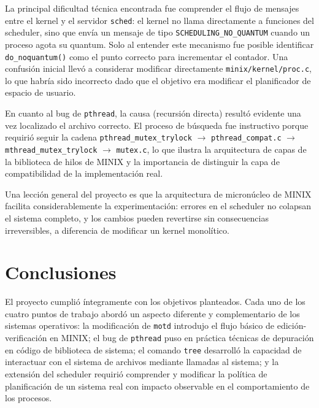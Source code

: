 \documentclass[11pt,a4paper]{article}
\begin{document}
La principal dificultad t\'ecnica encontrada fue comprender el flujo de mensajes entre el kernel y el servidor \texttt{sched}: el kernel no llama directamente a funciones del scheduler, sino que env\'ia un mensaje de tipo \texttt{SCHEDULING\_NO\_QUANTUM} cuando un proceso agota su quantum. Solo al entender este mecanismo fue posible identificar \texttt{do\_noquantum()} como el punto correcto para incrementar el contador. Una confusi\'on inicial llev\'o a considerar modificar directamente \texttt{minix/kernel/proc.c}, lo que habr\'ia sido incorrecto dado que el objetivo era modificar el planificador de espacio de usuario.

En cuanto al bug de \texttt{pthread}, la causa (recursi\'on directa) result\'o evidente una vez localizado el archivo correcto. El proceso de b\'usqueda fue instructivo porque requiri\'o seguir la cadena \texttt{pthread\_mutex\_trylock} $\to$ \texttt{pthread\_compat.c} $\to$ \texttt{mthread\_mutex\_trylock} $\to$ \texttt{mutex.c}, lo que ilustra la arquitectura de capas de la biblioteca de hilos de MINIX y la importancia de distinguir la capa de compatibilidad de la implementaci\'on real.

Una lecci\'on general del proyecto es que la arquitectura de micron\'ucleo de MINIX facilita considerablemente la experimentaci\'on: errores en el scheduler no colapsan el sistema completo, y los cambios pueden revertirse sin consecuencias irreversibles, a diferencia de modificar un kernel monol\'itico.

\section{Conclusiones}

El proyecto cumpli\'o \'integramente con los objetivos planteados. Cada uno de los cuatro puntos de trabajo abord\'o un aspecto diferente y complementario de los sistemas operativos: la modificaci\'on de \texttt{motd} introdujo el flujo b\'asico de edici\'on-verificaci\'on en MINIX; el bug de \texttt{pthread} puso en pr\'actica t\'ecnicas de depuraci\'on en c\'odigo de biblioteca de sistema; el comando \texttt{tree} desarroll\'o la capacidad de interactuar con el sistema de archivos mediante llamadas al sistema; y la extensi\'on del scheduler requiri\'o comprender y modificar la pol\'itica de planificaci\'on de un sistema real con impacto observable en el comportamiento de los procesos.
\end{document}
